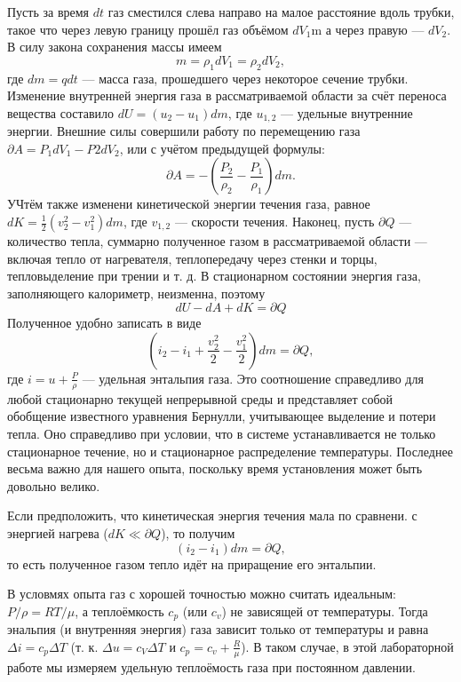\documentclass[a4paper, fontsize=14pt]{article}
\begin{document}
Пусть за время $dt$ газ сместился слева направо на малое расстояние вдоль
трубки, такое что через левую границу прошёл газ объёмом $dV_1$m а через правую --- $dV_2$. В силу закона сохранения массы имеем
\[
	m = \rho_1 dV_1 = \rho_2 d V_2,
\]
где $dm = q dt$ --- масса газа, прошедшего через некоторое сечение трубки.
Изменение внутренней энергия газа в рассматриваемой области за счёт переноса вещества составило $dU = (u_2 - u_1)dm$, где $u_{1, 2}$ --- удельные внутренние энергии. Внешние силы совершили работу по перемещению газа $\partial A = P_1 dV_1 - P2 dV_2$, или с учётом предыдущей формулы:
\[
	\partial A = - (\frac{P_2}{\rho_2} - \frac{P_1}{\rho_1})dm.
\]
УЧтём также изменени кинетической энергии течения газа, равное $dK = \frac{1}{2}(v_2^2 - v_1^2)dm$, где $v_{1, 2}$ --- скорости течения. Наконец, пусть $\partial Q$ --- количество тепла, суммарно полученное газом в рассматриваемой области --- включая тепло от нагревателя, теплопередачу через стенки и торцы, тепловыделение при трении и т. д. В стационарном состоянии энергия газа, заполняющего калориметр, неизменна, поэтому
\[
	dU - dA + dK = \partial Q
\]
Полученное удобно записать в виде
\[
	(i_2 - i_1 + \frac{v_2^2}{2} - \frac{v_1^2}{2}) dm = \partial Q,
\]
где $i = u + \frac{P}{\rho}$ --- удельная энтальпия газа.
Это соотношение справедливо для любой стационарно текущей непрерывной среды и представляет собой обобщение известного уравнения Бернулли, учитывающее выделение и потери тепла. Оно справедливо при условии, что в системе устанавливается не только стационарное течение, но и стационарное распределение температуры. Последнее весьма важно для нашего опыта, поскольку время установления может быть довольно велико.

Если предположить, что кинетическая энергия течения мала по сравнени. с энергией нагрева ($dK \ll \partial Q$), то получим 
\[
	(i_2 - i_1) dm = \partial Q,
\]
то есть полученное газом тепло идёт на приращение его энтальпии.

В условмях опыта газ с хорошей точностью можно считать идеальным: $P / \rho = RT / \mu$, а теплоёмкость $c_p$ (или $c_v$) не зависящей от температуры. Тогда энальпия (и внутренняя энергия) газа зависит только от температуры и равна $\Delta i = c_p \Delta T$ (т. к. $\Delta u = c_V \Delta T$ и $c_p = c_v + \frac{R}{\mu}$). В таком случае, в этой лабораторной работе мы измеряем удельную теплоёмость газа при постоянном давлении.
\end{document}
